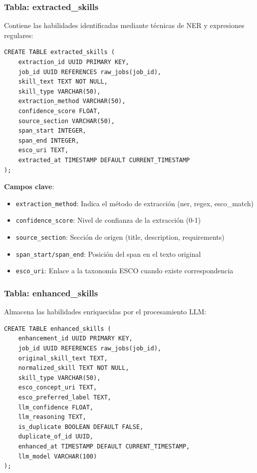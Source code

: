 \subsubsection{Tabla: extracted\_skills}

Contiene las habilidades identificadas mediante técnicas de NER y expresiones regulares:

\begin{verbatim}
CREATE TABLE extracted_skills (
    extraction_id UUID PRIMARY KEY,
    job_id UUID REFERENCES raw_jobs(job_id),
    skill_text TEXT NOT NULL,
    skill_type VARCHAR(50),
    extraction_method VARCHAR(50),
    confidence_score FLOAT,
    source_section VARCHAR(50),
    span_start INTEGER,
    span_end INTEGER,
    esco_uri TEXT,
    extracted_at TIMESTAMP DEFAULT CURRENT_TIMESTAMP
);
\end{verbatim}

\textbf{Campos clave}:
\begin{itemize}
    \item \texttt{extraction\_method}: Indica el método de extracción (ner, regex, esco\_match)
    \item \texttt{confidence\_score}: Nivel de confianza de la extracción (0-1)
    \item \texttt{source\_section}: Sección de origen (title, description, requirements)
    \item \texttt{span\_start/span\_end}: Posición del span en el texto original
    \item \texttt{esco\_uri}: Enlace a la taxonomía ESCO cuando existe correspondencia
\end{itemize}

\subsubsection{Tabla: enhanced\_skills}

Almacena las habilidades enriquecidas por el procesamiento LLM:

\begin{verbatim}
CREATE TABLE enhanced_skills (
    enhancement_id UUID PRIMARY KEY,
    job_id UUID REFERENCES raw_jobs(job_id),
    original_skill_text TEXT,
    normalized_skill TEXT NOT NULL,
    skill_type VARCHAR(50),
    esco_concept_uri TEXT,
    esco_preferred_label TEXT,
    llm_confidence FLOAT,
    llm_reasoning TEXT,
    is_duplicate BOOLEAN DEFAULT FALSE,
    duplicate_of_id UUID,
    enhanced_at TIMESTAMP DEFAULT CURRENT_TIMESTAMP,
    llm_model VARCHAR(100)
);
\end{verbatim}

